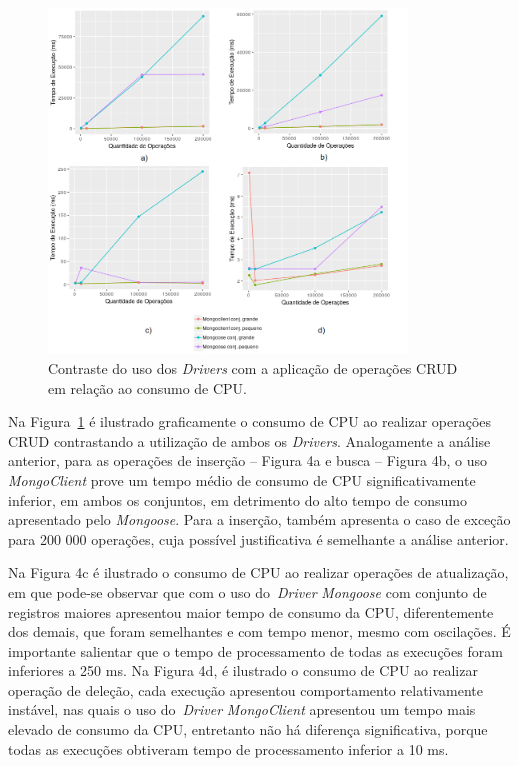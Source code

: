 \documentclass{svproc}
\begin{document}
\begin{figure}[!ht]
    \centering
    \includegraphics[width=0.85\textwidth]{images/cpuusage}
	 \caption{Contraste do uso dos \emph{Drivers} com a aplicação de operações CRUD em relação ao consumo de CPU.}
    \label{fig:cpuusage}
\end{figure}

Na Figura~\ref{fig:cpuusage} é ilustrado graficamente o consumo de CPU ao realizar operações CRUD contrastando a utilização de ambos os \emph{Drivers}.
Analogamente a análise anterior, para as operações de inserção -- Figura 4a e busca -- Figura 4b, o uso \emph{MongoClient} prove um tempo médio de consumo de CPU significativamente inferior, em ambos os conjuntos, em detrimento do alto tempo de consumo apresentado pelo \emph{Mongoose}. Para a inserção, também apresenta o caso de exceção para 200 000 operações, cuja possível justificativa é semelhante a análise anterior.

Na Figura 4c é ilustrado o consumo de CPU ao realizar operações de atualização, em que pode-se observar que com o uso do~\emph{Driver} \emph{Mongoose} com conjunto de registros maiores apresentou maior tempo de consumo da CPU, diferentemente dos demais, que foram semelhantes e com tempo menor, mesmo com oscilações. 
É importante salientar que o tempo de processamento de todas as execuções foram inferiores a 250 ms.
Na Figura 4d, é ilustrado o consumo de CPU ao realizar operação de deleção, cada execução apresentou comportamento relativamente instável, nas quais o uso do~\emph{Driver} \emph{MongoClient} apresentou um tempo mais elevado de consumo da CPU, entretanto não há diferença significativa, porque todas as execuções obtiveram tempo de processamento inferior a 10 ms.
\end{document}
